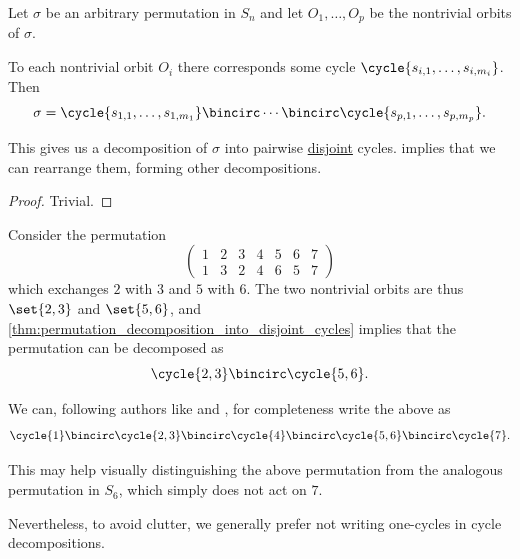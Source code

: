 \begin{proposition}\label{thm:permutation_decomposition_into_disjoint_cycles}
  Let \( \sigma \) be an arbitrary permutation in \( S_n \) and let \( O_1, \ldots, O_p \) be the nontrivial orbits of \( \sigma \).

  To each nontrivial orbit \( O_i \) there corresponds some cycle \( \cycle{ s_{i,1}, \ldots, s_{i,m_i} } \). Then
  \begin{equation*}
    \sigma = \cycle{ s_{1,1}, \ldots, s_{1,m_1} } \bincirc \cdots \bincirc \cycle{ s_{p,1}, \ldots, s_{p,m_p} }.
  \end{equation*}

  This gives us a decomposition of \( \sigma \) into pairwise \hyperref[def:disjoint_cycle]{disjoint} cycles.  implies that we can rearrange them, forming other decompositions.
\end{proposition}
\begin{proof}
  Trivial.
\end{proof}

\begin{remark}\label{rem:identity_in_permutation_decomposition}
  Consider the permutation
  \begin{equation*}
    \begin{pmatrix}
      1 & 2 & 3 & 4 & 5 & 6 & 7 \\
      1 & 3 & 2 & 4 & 6 & 5 & 7
    \end{pmatrix}
  \end{equation*}
  which exchanges \( 2 \) with \( 3 \) and \( 5 \) with \( 6 \). The two nontrivial orbits are thus \( \set{ 2, 3 } \) and \( \set{ 5, 6 } \), and \cref{thm:permutation_decomposition_into_disjoint_cycles} implies that the permutation can be decomposed as
  \begin{equation*}
    \cycle{ 2, 3 } \bincirc \cycle{ 5, 6 }.
  \end{equation*}

  We can, following authors like \textcite[49]{Jacobson1985BasicAlgebraI} and \textcite[118]{Rotman2015AdvancedModernAlgebraPart1}, for completeness write the above as
  \begin{equation*}
     \cycle{ 1 } \bincirc \cycle{ 2, 3 } \bincirc \cycle{ 4 } \bincirc \cycle{ 5, 6 } \bincirc \cycle{ 7 }.
  \end{equation*}

  This may help visually distinguishing the above permutation from the analogous permutation in \( S_6 \), which simply does not act on \( 7 \).

  Nevertheless, to avoid clutter, we generally prefer not writing one-cycles in cycle decompositions.
\end{remark}

